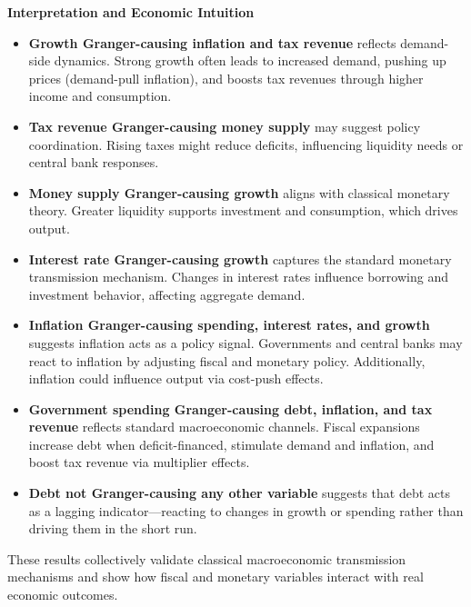 \documentclass[a4paper,12pt]{article}
\begin{document}
\textbf{Interpretation and Economic Intuition}

\begin{itemize}
  \item \textbf{Growth Granger-causing inflation and tax revenue} reflects demand-side dynamics. Strong growth often leads to increased demand, pushing up prices (demand-pull inflation), and boosts tax revenues through higher income and consumption.
  
  \item \textbf{Tax revenue Granger-causing money supply} may suggest policy coordination. Rising taxes might reduce deficits, influencing liquidity needs or central bank responses.

  \item \textbf{Money supply Granger-causing growth} aligns with classical monetary theory. Greater liquidity supports investment and consumption, which drives output.

  \item \textbf{Interest rate Granger-causing growth} captures the standard monetary transmission mechanism. Changes in interest rates influence borrowing and investment behavior, affecting aggregate demand.

  \item \textbf{Inflation Granger-causing spending, interest rates, and growth} suggests inflation acts as a policy signal. Governments and central banks may react to inflation by adjusting fiscal and monetary policy. Additionally, inflation could influence output via cost-push effects.

  \item \textbf{Government spending Granger-causing debt, inflation, and tax revenue} reflects standard macroeconomic channels. Fiscal expansions increase debt when deficit-financed, stimulate demand and inflation, and boost tax revenue via multiplier effects.

  \item \textbf{Debt not Granger-causing any other variable} suggests that debt acts as a lagging indicator—reacting to changes in growth or spending rather than driving them in the short run.
\end{itemize}

These results collectively validate classical macroeconomic transmission mechanisms and show how fiscal and monetary variables interact with real economic outcomes.
\end{document}
